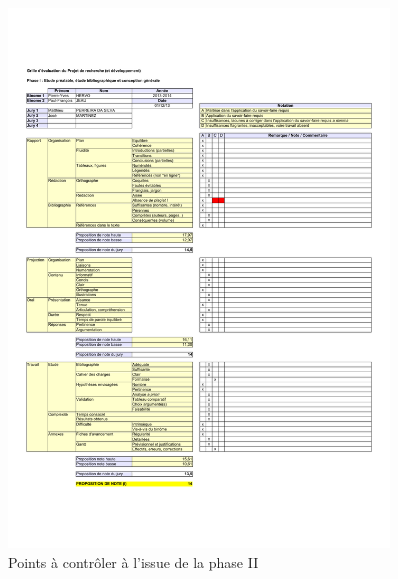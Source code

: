\documentclass[11pt, french]{report-rd-info}
\begin{document}
\begin{figure}
        \includegraphics[width=0.9\textwidth]{Images/Grille-Evaluation-PRD1}
     \fi
	\caption{Points à contrôler à l'issue de la phase II}
	\label{fig:AutoEvaluationTravailFinal}
\end{figure}
\end{document}
